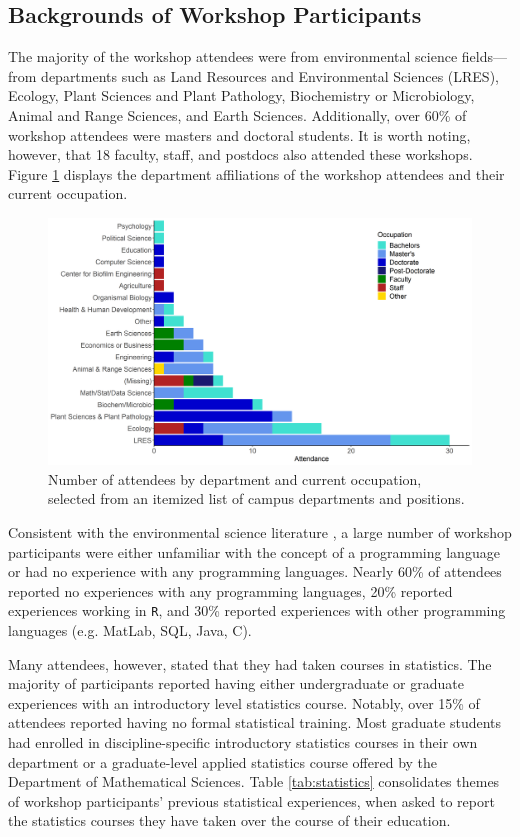 \documentclass[12pt]{article}
\begin{document}
\subsection{Backgrounds of Workshop Participants}

\quad The majority of the workshop attendees were from environmental science
fields---from departments such as Land Resources and Environmental Sciences
(LRES), Ecology, Plant Sciences and Plant Pathology, Biochemistry or
Microbiology, Animal and Range Sciences, and Earth Sciences. Additionally, over
60\% of workshop attendees were masters and doctoral students. It is worth
noting, however, that 18 faculty, staff, and postdocs also attended these
workshops. Figure \ref{fig:departments} displays the department affiliations of
the workshop attendees and their current occupation. 

{
\begin{figure}[h!]
\centering
\includegraphics[width = \textwidth]{images/better_colors_attendance.png}
\caption{Number of attendees by department and current occupation, selected from
an itemized list of campus departments and positions.}
    \label{fig:departments}
\end{figure}
}

\quad Consistent with the environmental science literature \citep{andelman, 
hampton, hernandez, datacarpentry}, a large number of workshop participants were
either unfamiliar with the concept of a programming language or had no
experience with any programming languages. Nearly 60\% of attendees reported no
experiences with any programming languages, 20\% reported experiences working in
\texttt{R}, and 30\% reported experiences with other programming languages (e.g.
MatLab, SQL, Java, C). 

\quad Many attendees, however, stated that they had taken courses in statistics.
The majority of participants reported having either undergraduate or graduate
experiences with an introductory level statistics course. Notably, over 15\% of
attendees reported having no formal statistical training. Most graduate students
had enrolled in discipline-specific introductory statistics courses in their own
department or a graduate-level applied statistics course offered by the
Department of Mathematical Sciences. Table \ref{tab:statistics} consolidates 
themes of workshop participants' previous statistical experiences, when asked to
report the statistics courses they have taken over the course of their
education. 
\end{document}

